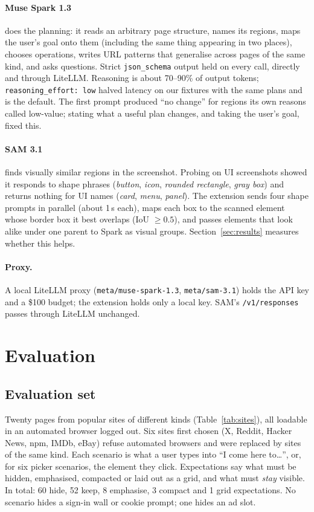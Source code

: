 \documentclass[10pt,a4paper]{article}
\begin{document}
\paragraph{Muse Spark 1.3} does the planning: it reads an arbitrary page structure, names its regions, maps the user's goal onto them (including the same thing appearing in two places), chooses operations, writes URL patterns that generalise across pages of the same kind, and asks questions. Strict \texttt{json\_schema} output held on every call, directly and through LiteLLM. Reasoning is about 70--90\% of output tokens; \texttt{reasoning\_effort: low} halved latency on our fixtures with the same plans and is the default. The first prompt produced ``no change'' for regions its own reasons called low-value; stating what a useful plan changes, and taking the user's goal, fixed this.

\paragraph{SAM 3.1} finds visually similar regions in the screenshot. Probing on UI screenshots showed it responds to shape phrases (\emph{button}, \emph{icon}, \emph{rounded rectangle}, \emph{gray box}) and returns nothing for UI names (\emph{card}, \emph{menu}, \emph{panel}). The extension sends four shape prompts in parallel (about 1\,s each), maps each box to the scanned element whose border box it best overlaps (IoU $\ge 0.5$), and passes elements that look alike under one parent to Spark as visual groups. Section~\ref{sec:results} measures whether this helps.

\paragraph{Proxy.} A local LiteLLM proxy (\texttt{meta/muse-spark-1.3}, \texttt{meta/sam-3.1}) holds the API key and a \$100 budget; the extension holds only a local key. SAM's \texttt{/v1/responses} passes through LiteLLM unchanged.

\section{Evaluation}\label{sec:eval}

\subsection{Evaluation set}
Twenty pages from popular sites of different kinds (Table~\ref{tab:sites}), all loadable in an automated browser logged out. Six sites first chosen (X, Reddit, Hacker News, npm, IMDb, eBay) refuse automated browsers and were replaced by sites of the same kind. Each scenario is what a user types into ``I come here to\ldots'', or, for six picker scenarios, the element they click. Expectations say what must be hidden, emphasised, compacted or laid out as a grid, and what must \emph{stay} visible. In total: 60 hide, 52 keep, 8 emphasise, 3 compact and 1 grid expectations. No scenario hides a sign-in wall or cookie prompt; one hides an ad slot.
\end{document}
